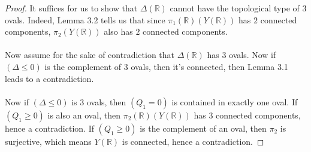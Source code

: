 \documentclass{article}
\newcommand{\Rbb}{\mathbb{R}}
\begin{document}
\begin{proof}
It suffices for us to show that $\Delta(\Rbb)$ cannot have the topological type of $3$ ovals. Indeed, Lemma 3.2 tells us that since $\pi_1(\Rbb)(Y(\Rbb))$ has $2$ connected components, $\pi_2(Y(\Rbb))$ also has $2$ connected components.\\\\
Now assume for the sake of contradiction that $\Delta(\Rbb)$ has 3 ovals. Now if $(\Delta \leq 0)$ is the complement of 3 ovals, then it's connected, then Lemma 3.1 leads to a contradiction.\\\\
Now if $(\Delta \leq 0)$ is 3 ovals, then $(Q_1 = 0)$ is contained in exactly one oval. If $(Q_1 \geq 0)$ is also an oval, then $\pi_2(\Rbb)(Y(\Rbb))$ has 3 connected components, hence a contradiction. If $(Q_1 \geq 0)$ is the complement of an oval, then $\pi_2$ is surjective, which means $Y(\Rbb)$ is connected, hence a contradiction.
\end{proof}
\end{document}
